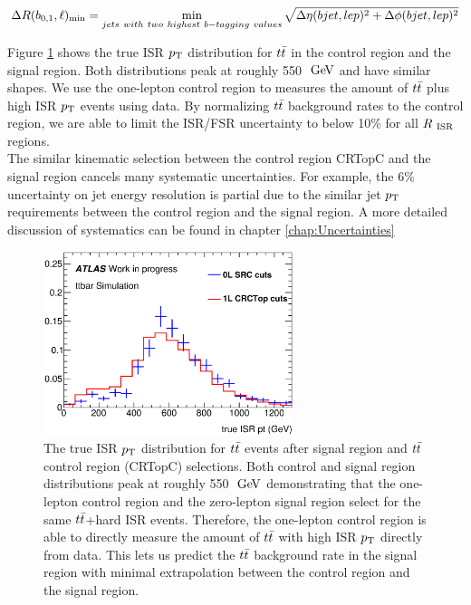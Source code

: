 \begin{equation}
\mindrblep = \min_{jets~with~two~highest~b-tagging~values} \sqrt{ \Delta\eta(bjet, lep)^2 + \Delta\phi(bjet, lep)^2}
\label{eqn:mindrblep}
\end{equation}


\indent Figure \ref{fig:ttbar:CR:trueISRpt} shows the true ISR $\pt$ distribution for $\ttbar$ in the control region and the signal region.  Both distributions peak at roughly 550 $\gev$ and have similar shapes.  We use the one-lepton control region to measures the amount of $\ttbar$ plus high ISR $\pt$ events using data.  By normalizing $\ttbar$ background rates to the control region, we are able to limit the ISR/FSR uncertainty to below 10\% for all $R_{~\mathrm{ISR}}$ regions.  \\

\indent The similar kinematic selection between the control region CRTopC and the signal region cancels many systematic uncertainties.   For example, the 6\% uncertainty on jet energy resolution is partial due to the similar jet $\pt$ requirements between the control region and the signal region. A more detailed discussion of systematics can be found in chapter \ref{chap:Uncertainties} \\

\begin{figure}[h!]
  \centering
	\includegraphics[width=0.65\textwidth]{./figures/ttbar/truePtISR_SRC_CRC_compare.eps}
	\caption[The true ISR $\pt$ distribution for $\ttbar$ events after signal region and $\ttbar$ control region (CRTopC) selections]{The true ISR $\pt$ distribution for $\ttbar$ events after signal region and $\ttbar$ control region (CRTopC) selections.  Both control and signal region distributions peak at roughly 550 $\gev$ demonstrating that the one-lepton control region and the zero-lepton signal region select for the same $\ttbar$+hard ISR events.  Therefore, the one-lepton control region is able to directly measure the amount of $\ttbar$ with high ISR $\pt$ directly from data.  This lets us predict the $\ttbar$ background rate in the signal region with minimal extrapolation between the control region and the signal region.}
	\label{fig:ttbar:CR:trueISRpt}
\end{figure}

